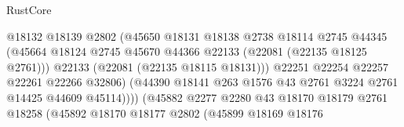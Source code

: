 \begin{lexlean}{RustCore}
\begin{coremodule}
                                            @18132
                                            @18139
                                            @2802
                                            (@45650
                                              @18131
                                              @18138
                                              @2738
                                              @18114
                                              @2745
                                              @44345
                                              (@45664
                                                @18124
                                                @2745
                                                @45670
                                                @44366
                                                @22133
                                                (@22081 (@22135 @18125 @2761)))
                                              @22133
                                              (@22081 (@22135 @18115 @18131)))
                                            @22251
                                            @22254
                                            @22257
                                            @22261
                                            @22266
                                            @32806)
                                          (@44390
                                            @18141
                                            @263
                                            @1576
                                            @43
                                            @2761
                                            @3224
                                            @2761
                                            @14425
                                            @44609
                                            @45114))))
                                    (@45882
                                      @2277
                                      @2280
                                      @43
                                      @18170
                                      @18179
                                      @2761
                                      @18258
                                      (@45892
                                        @18170
                                        @18177
                                        @2802
                                        (@45899
                                          @18169
                                          @18176

\end{coremodule}
\end{lexlean}
